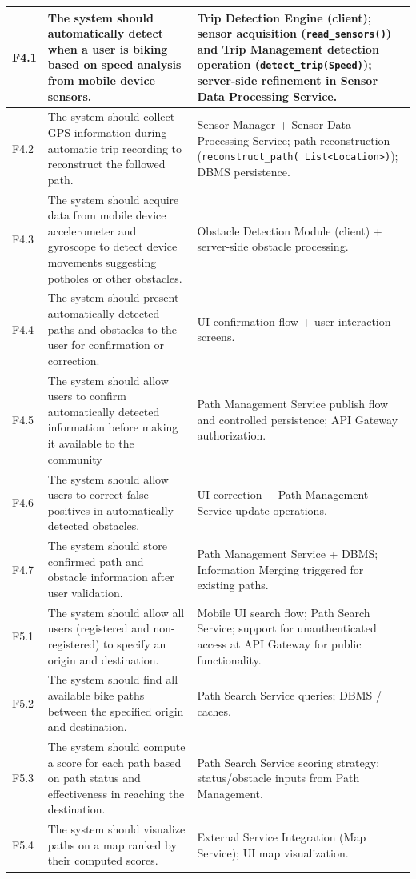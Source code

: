 \begin{longtable}{|p{}|p{}|p{}|}
    F4.1 & The system should automatically detect when a user is biking based on speed analysis from mobile device sensors. &
    Trip Detection Engine (client); sensor acquisition (\texttt{read\_sensors()}) and Trip Management detection operation (\texttt{detect\_trip(Speed)}); server-side refinement in Sensor Data Processing Service. \\
    \hline
    F4.2 & The system should collect GPS information during automatic trip recording to reconstruct the followed path. &
    Sensor Manager + Sensor Data Processing Service; path reconstruction (\texttt{reconstruct\_path(
        List<Location>)}); DBMS persistence. \\
    \hline
    F4.3 & The system should acquire data from mobile device accelerometer and gyroscope to detect device movements suggesting potholes or other obstacles. &
    Obstacle Detection Module (client) + server-side obstacle processing. \\
    \hline
    F4.4 & The system should present automatically detected paths and obstacles to the user for confirmation or correction. &
    UI confirmation flow + user interaction screens. \\
    \hline
    F4.5 & The system should allow users to confirm automatically detected information before making it available to the community &
    Path Management Service publish flow and controlled persistence; API Gateway authorization. \\
    \hline
    F4.6 & The system should allow users to correct false positives in automatically detected obstacles. &
    UI correction + Path Management Service update operations. \\
    \hline
    F4.7 & The system should store confirmed path and obstacle information after user validation. &
    Path Management Service + DBMS; Information Merging triggered for existing paths. \\
    \hline

    F5.1 & The system should allow all users (registered and non-registered) to specify an origin and destination. &
    Mobile UI search flow; Path Search Service; support for unauthenticated access at API Gateway for public functionality. \\
    \hline
    F5.2 & The system should find all available bike paths between the specified origin and destination. &
    Path Search Service queries; DBMS / caches. \\
    \hline
    F5.3 & The system should compute a score for each path based on path status and effectiveness in reaching the destination. &
    Path Search Service scoring strategy; status/obstacle inputs from Path Management. \\
    \hline
    F5.4 & The system should visualize paths on a map ranked by their computed scores. &
    External Service Integration (Map Service); UI map visualization. \\
    \hline


\end{longtable}
